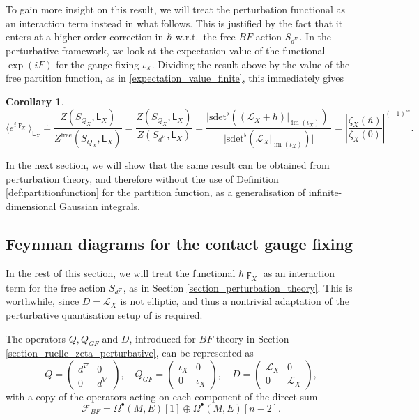 \documentclass[reqno]{amsart}
\newtheorem{cor}[thm]{Corollary}
\theoremstyle{definition}
\theoremstyle{remark}
\renewcommand{\d}{d^\nabla}
\newcommand{\F}{\mathcal{F}}
\newcommand{\h}{\hbar}
\newcommand{\sfL}{\mathsf{L}}
\renewcommand{\L}{\mathcal{L}}
\newcommand{\sdet}{\mathrm{sdet}^\flat}
\DeclareMathOperator{\im}{im}
\begin{document}
To gain more insight on this result, we will treat the perturbation functional as an interaction term instead in what follows. This is justified by the fact that it enters at a higher order correction in $\h$ w.r.t.\ the free $BF$ action $S_{\d}$.
In the perturbative framework, we look at the expectation value of the functional $\exp(iF)$ for the gauge fixing $\iota_X$. Dividing the result above by the value of the free partition function, as in \eqref{expectation_value_finite}, this immediately gives 
\begin{cor}\label{cor:expectationvaluefromPF}
\begin{equation}
\label{F_gaussian_expectation}
    \biggl\langle e^{i\digamma_X} \biggr\rangle_{\sfL_X} \doteq \frac{Z(S_{Q_X},\sfL_X)}{Z^{\text{free}}(S_{Q_X},\sfL_X)} = \frac{Z(S_{Q_X},\sfL_X)}{Z(S_{\d},\sfL_X)} = \frac{\big|\sdet((\L_X+\h)|_{\im(\iota_X)})\big|}{\big|\sdet(\L_X|_{\im(\iota_X)})\big|} = \left|\frac{\zeta_X(\h)}{\zeta_X(0)}\right|^{(-1)^m}.
\end{equation}
\end{cor}
In the next section, we will show that the same result can be obtained from perturbation theory, and therefore without the use of Definition \ref{def:partitionfunction} for the partition function, as a generalisation of infinite-dimensional Gaussian integrals.

\subsection{Feynman diagrams for the contact gauge fixing}
\label{section_diagrams_ruelle}

In the rest of this section, we will treat the functional $\h \digamma_X$ as an interaction term for the free action $S_{\d}$, as in Section \ref{section_perturbation_theory}. This is worthwhile, since $D=\L_X$ is not elliptic, and thus a nontrivial adaptation of the perturbative quantisation setup of \cite{costello} is required.


The operators $Q, Q_{GF}$ and $D$, introduced for $BF$ theory in Section \ref{section_ruelle_zeta_perturbative}, can be represented as
\begin{equation*}
    Q = \begin{pmatrix} \d & 0 \\ 0 & \d \end{pmatrix}, \quad Q_{GF} = \begin{pmatrix} \iota_X & 0 \\ 0 & \iota_X \end{pmatrix}, \quad D = \begin{pmatrix} \L_X & 0 \\ 0 & \L_X \end{pmatrix},
\end{equation*}
with a copy of the operators acting on each component of the direct sum 
$$\F_{BF} = \Omega^\bullet(M,E)[1] \oplus \Omega^\bullet(M,E)[n-2].$$
\end{document}
